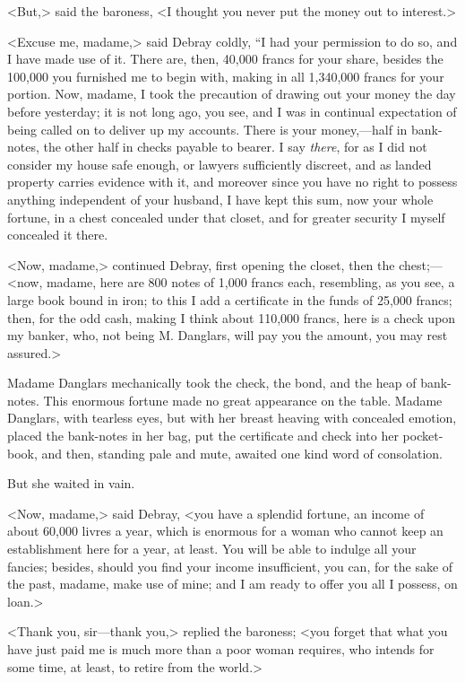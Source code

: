  <But,> said the baroness, <I thought you never put the money out to interest.> 

 <Excuse me, madame,> said Debray coldly, “I had your permission to do so, and I have made use of it. There are, then, 40,000 francs for your share, besides the 100,000 you furnished me to begin with, making in all 1,340,000 francs for your portion. Now, madame, I took the precaution of drawing out your money the day before yesterday; it is not long ago, you see, and I was in continual expectation of being called on to deliver up my accounts. There is your money,—half in bank-notes, the other half in checks payable to bearer. I say \textit{there}, for as I did not consider my house safe enough, or lawyers sufficiently discreet, and as landed property carries evidence with it, and moreover since you have no right to possess anything independent of your husband, I have kept this sum, now your whole fortune, in a chest concealed under that closet, and for greater security I myself concealed it there. 

 <Now, madame,> continued Debray, first opening the closet, then the chest;—<now, madame, here are 800 notes of 1,000 francs each, resembling, as you see, a large book bound in iron; to this I add a certificate in the funds of 25,000 francs; then, for the odd cash, making I think about 110,000 francs, here is a check upon my banker, who, not being M. Danglars, will pay you the amount, you may rest assured.> 

 Madame Danglars mechanically took the check, the bond, and the heap of bank-notes. This enormous fortune made no great appearance on the table. Madame Danglars, with tearless eyes, but with her breast heaving with concealed emotion, placed the bank-notes in her bag, put the certificate and check into her pocket-book, and then, standing pale and mute, awaited one kind word of consolation. 

 But she waited in vain. 

 <Now, madame,> said Debray, <you have a splendid fortune, an income of about 60,000 livres a year, which is enormous for a woman who cannot keep an establishment here for a year, at least. You will be able to indulge all your fancies; besides, should you find your income insufficient, you can, for the sake of the past, madame, make use of mine; and I am ready to offer you all I possess, on loan.> 

 <Thank you, sir—thank you,> replied the baroness; <you forget that what you have just paid me is much more than a poor woman requires, who intends for some time, at least, to retire from the world.> 

